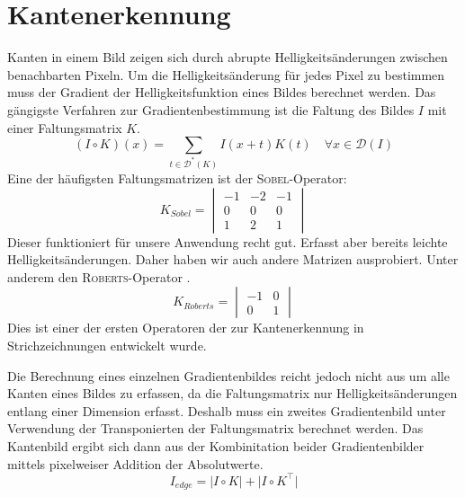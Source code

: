 \section*{Kantenerkennung}

Kanten in einem Bild zeigen sich durch abrupte Helligkeitsänderungen zwischen
benachbarten Pixeln.
Um die Helligkeitsänderung für jedes Pixel zu bestimmen muss der Gradient der
Helligkeitsfunktion eines Bildes berechnet werden.
Das gängigste Verfahren zur Gradientenbestimmung ist die Faltung des Bildes $I$
mit einer Faltungsmatrix $K$.
  \[ (I \circ K)(x) = \sum_{t\in\mathcal{D}^*(K)} I(x+t) K(t)
       \quad \forall x\in\mathcal{D}(I) \]
Eine der häufigsten Faltungsmatrizen ist der \textsc{Sobel}-Operator:
  \[ K_{Sobel} =  \begin{vmatrix}
           -1 & -2 & -1 \\
            0 &  0 &  0 \\
            1 &  2 &  1
         \end{vmatrix} \]
Dieser funktioniert für unsere Anwendung recht gut. Erfasst aber bereits leichte
Helligkeitsänderungen.
Daher haben wir auch andere Matrizen ausprobiert.
Unter anderem den \textsc{Roberts}-Operator \cite{DBLP:books/garland/Roberts63}.
  \[ K_{Roberts} = \begin{vmatrix}
           -1 & 0 \\
            0 & 1
         \end{vmatrix} \]
Dies ist einer der ersten Operatoren der zur Kantenerkennung in
Strichzeichnungen entwickelt wurde.

Die Berechnung eines einzelnen Gradientenbildes reicht jedoch nicht aus um alle
Kanten eines Bildes zu erfassen, da die Faltungsmatrix nur Helligkeitsänderungen
entlang einer Dimension erfasst.
Deshalb muss ein zweites Gradientenbild unter Verwendung der Transponierten der
Faltungsmatrix berechnet werden.
Das Kantenbild ergibt sich dann aus der Kombinitation beider Gradientenbilder
mittels pixelweiser Addition der Absolutwerte.
  \[ I_{edge} = \Big|I \circ K\Big| + \Big|I \circ K^\top\Big| \]
